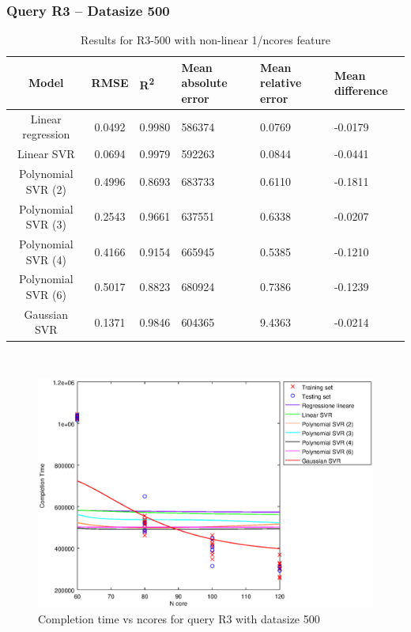 \documentclass[a4paper,11pt]{article}
\begin{document}
\newpage
\subsubsection{Query R3 -- Datasize 500}
\begin{table}[H]
	\centering
	\begin{adjustbox}{center}
		\begin{tabular}{c | c M{1.2cm} M{2.5cm} M{2.5cm} M{1.8cm}}
			Model & RMSE & R\textsuperscript{2} & Mean absolute error & Mean relative error & Mean difference \tabularnewline
			\hline
			Linear regression & 0.0492 & 0.9980 & 586374 & 0.0769 & -0.0179 \\
			Linear SVR & 0.0694 & 0.9979 & 592263 & 0.0844 & -0.0441 \\
			Polynomial SVR (2) & 0.4996 & 0.8693 & 683733 & 0.6110 & -0.1811 \\
			Polynomial SVR (3) & 0.2543 & 0.9661 & 637551 & 0.6338 & -0.0207 \\
			Polynomial SVR (4) & 0.4166 & 0.9154 & 665945 & 0.5385 & -0.1210 \\
			Polynomial SVR (6) & 0.5017 & 0.8823 & 680924 & 0.7386 & -0.1239 \\
			Gaussian SVR & 0.1371 & 0.9846 & 604365 & 9.4363 & -0.0214 \\
		\end{tabular}
	\end{adjustbox}
	\\
	\caption{Results for R3-500 with non-linear 1/ncores feature}
	\label{table_R3_prediction_all}
\end{table}

\begin {figure}[hbtp]
\centering
\includegraphics[width=\textwidth]{output/R3_500_1_OVER_NCORES/plot_R3_500.eps}
\caption {Completion time vs ncores for query R3 with datasize 500}
\end {figure}
\end{document}
